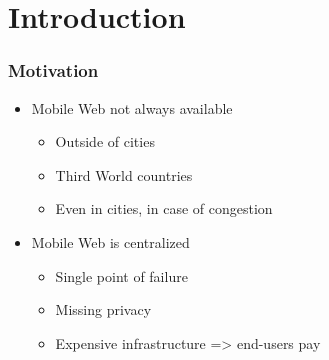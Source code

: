 \section{Introduction}

\begin{frame}
  \frametitle{Motivation}  
  \begin{itemize}
    \item Mobile Web not always available
    \vspace{0.3cm}
    \begin{itemize}
      \item Outside of cities
      \vspace{0.1cm}
      \item Third World countries
      \vspace{0.1cm}
      \item Even in cities, in case of congestion
    \end{itemize}
  \end{itemize}

  \vspace{0.3cm}

  \begin{itemize}
    \item Mobile Web is centralized
    \vspace{0.3cm}
    \begin{itemize}
      \item Single point of failure
      \vspace{0.1cm}
      \item Missing privacy
      \vspace{0.1cm}
      \item Expensive infrastructure => end-users pay
    \end{itemize}
  \end{itemize}
\end{frame}


